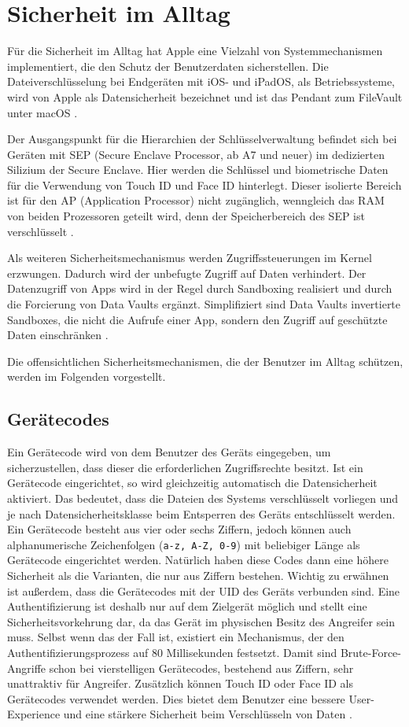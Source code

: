 \section{Sicherheit im Alltag}
Für die Sicherheit im Alltag hat Apple eine Vielzahl von Systemmechanismen implementiert, 
die den Schutz der Benutzerdaten sicherstellen. Die Dateiverschlüsselung bei Endgeräten mit iOS- und 
iPadOS, als Betriebssysteme, wird von Apple als Datensicherheit bezeichnet und ist das Pendant zum 
FileVault unter macOS \cite{apple2020}.

Der Ausgangspunkt für die Hierarchien der Schlüsselverwaltung befindet sich bei Geräten 
mit SEP (Secure Enclave Processor, ab A7 und neuer) im dedizierten Silizium der Secure Enclave. 
Hier werden die Schlüssel und biometrische Daten für die Verwendung von Touch ID und Face ID 
hinterlegt. Dieser isolierte Bereich ist für den AP (Application Processor) nicht zugänglich, wenngleich 
das RAM von beiden Prozessoren geteilt wird, denn der Speicherbereich des SEP
ist verschlüsselt \cite{apple2020}.

Als weiteren Sicherheitsmechanismus werden Zugriffssteuerungen im Kernel erzwungen. Dadurch wird der unbefugte 
Zugriff auf Daten verhindert. Der Datenzugriff von Apps wird in der Regel durch Sandboxing realisiert und durch die 
Forcierung von Data Vaults ergänzt. Simplifiziert sind Data Vaults invertierte Sandboxes, die nicht die Aufrufe einer App, 
sondern den Zugriff auf geschützte Daten einschränken \cite{apple2020}.

Die offensichtlichen Sicherheitsmechanismen, die der Benutzer im Alltag schützen, werden im Folgenden vorgestellt.

\subsection{Gerätecodes}
Ein Gerätecode wird von dem Benutzer des Geräts eingegeben, um sicherzustellen,
dass dieser die erforderlichen Zugriffsrechte besitzt. Ist ein Gerätecode
eingerichtet, so wird gleichzeitig automatisch die Datensicherheit aktiviert.
Das bedeutet, dass die Dateien des Systems verschlüsselt vorliegen und je nach
Datensicherheitsklasse beim Entsperren des Geräts entschlüsselt werden. Ein
Gerätecode besteht aus vier oder sechs Ziffern, jedoch können auch
alphanumerische Zeichenfolgen (\texttt{a-z, A-Z, 0-9}) mit beliebiger Länge als
Gerätecode eingerichtet werden. Natürlich haben diese Codes dann eine höhere
Sicherheit als die Varianten, die nur aus Ziffern bestehen. Wichtig zu erwähnen
ist außerdem, dass die Gerätecodes mit der UID des Geräts verbunden sind. Eine
Authentifizierung ist deshalb nur auf dem Zielgerät möglich und stellt eine
Sicherheitsvorkehrung dar, da das Gerät im physischen Besitz des Angreifer sein
muss. Selbst wenn das der Fall ist, existiert ein Mechanismus, der den
Authentifizierungsprozess auf 80 Millisekunden festsetzt. Damit sind
Brute-Force-Angriffe schon bei vierstelligen Gerätecodes, bestehend aus Ziffern,
sehr unattraktiv für Angreifer. Zusätzlich können Touch ID oder Face ID als
Gerätecodes verwendet werden. Dies bietet dem Benutzer eine bessere
User-Experience und eine stärkere Sicherheit beim Verschlüsseln von Daten
\cite{apple2020}.

